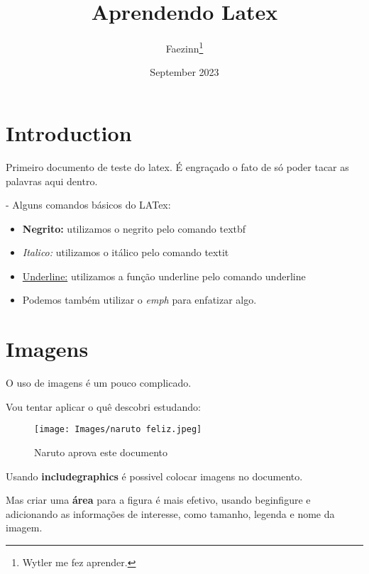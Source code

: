 \documentclass[12pt, a4paper]{article}
\title{Aprendendo Latex}
\author{Faezinn\thanks{Wytler me fez aprender.}}
\date{September 2023}
\begin{document}
\maketitle

\tableofcontents

\section{Introduction}

Primeiro documento de teste do latex. É engraçado o fato de só poder tacar as palavras aqui dentro. 


- Alguns comandos básicos do LATex:

\begin{itemize}
    \item \textbf{Negrito:} utilizamos o negrito pelo comando textbf
    \item \textit{Italico:} utilizamos o itálico pelo comando textit
    \item \underline{Underline:} utilizamos a função underline pelo comando underline
    \item Podemos também utilizar o \emph{emph} para enfatizar algo.

\end{itemize}

\section{Imagens}

O uso de imagens é um pouco complicado.

Vou tentar aplicar o quê descobri estudando:

\begin{figure}[h]
    \centering %
    \texttt{[image: Images/naruto feliz.jpeg]} %
    \caption{Naruto aprova este documento} %
    \label{fig:naruto feliz}
\end{figure}


Usando \textbf{includegraphics} é possivel colocar imagens no documento.

Mas criar uma \textbf{área} para a figura é mais efetivo, usando begin{figure} e adicionando as informações de interesse, como tamanho, legenda e nome da imagem. 
\end{document}
